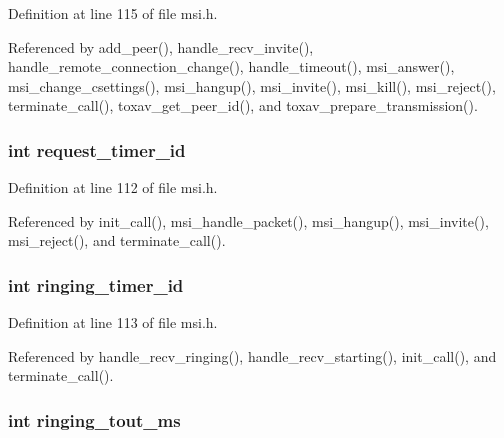 Definition at line 115 of file msi.\+h.



Referenced by add\+\_\+peer(), handle\+\_\+recv\+\_\+invite(), handle\+\_\+remote\+\_\+connection\+\_\+change(), handle\+\_\+timeout(), msi\+\_\+answer(), msi\+\_\+change\+\_\+csettings(), msi\+\_\+hangup(), msi\+\_\+invite(), msi\+\_\+kill(), msi\+\_\+reject(), terminate\+\_\+call(), toxav\+\_\+get\+\_\+peer\+\_\+id(), and toxav\+\_\+prepare\+\_\+transmission().

\hypertarget{struct___m_s_i_call_a8ccfd1cd9f807007763f41eafd801130}{
\subsubsection[{request\+\_\+timer\+\_\+id}]{\setlength{\rightskip}{0pt plus 5cm}int request\+\_\+timer\+\_\+id}}\label{struct___m_s_i_call_a8ccfd1cd9f807007763f41eafd801130}


Definition at line 112 of file msi.\+h.



Referenced by init\+\_\+call(), msi\+\_\+handle\+\_\+packet(), msi\+\_\+hangup(), msi\+\_\+invite(), msi\+\_\+reject(), and terminate\+\_\+call().

\hypertarget{struct___m_s_i_call_a94fdc66dbd509ba4e89edcedb8e11022}{
\subsubsection[{ringing\+\_\+timer\+\_\+id}]{\setlength{\rightskip}{0pt plus 5cm}int ringing\+\_\+timer\+\_\+id}}\label{struct___m_s_i_call_a94fdc66dbd509ba4e89edcedb8e11022}


Definition at line 113 of file msi.\+h.



Referenced by handle\+\_\+recv\+\_\+ringing(), handle\+\_\+recv\+\_\+starting(), init\+\_\+call(), and terminate\+\_\+call().

\hypertarget{struct___m_s_i_call_ad8fefcfbba597fbff4216644f2872acf}{
\subsubsection[{ringing\+\_\+tout\+\_\+ms}]{\setlength{\rightskip}{0pt plus 5cm}int ringing\+\_\+tout\+\_\+ms}}\label{struct___m_s_i_call_ad8fefcfbba597fbff4216644f2872acf}


